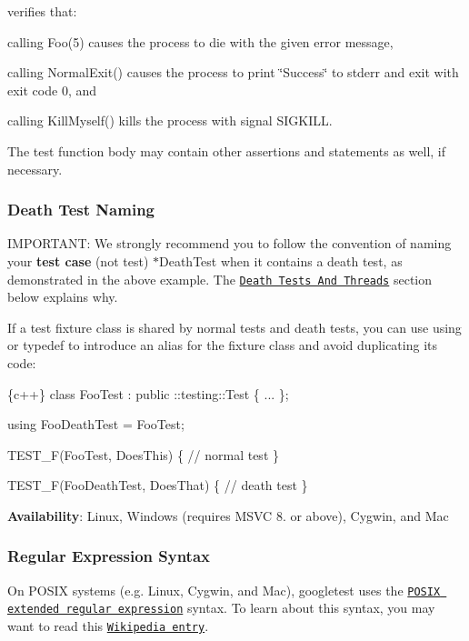 verifies that\+:


\begin{DoxyItemize}
\item calling {\ttfamily Foo(5)} causes the process to die with the given error message,
\item calling {\ttfamily Normal\+Exit()} causes the process to print {\ttfamily \char`\"{}\+Success\char`\"{}} to stderr and exit with exit code 0, and
\item calling {\ttfamily Kill\+Myself()} kills the process with signal {\ttfamily S\+I\+G\+K\+I\+LL}.
\end{DoxyItemize}

The test function body may contain other assertions and statements as well, if necessary.

\subsubsection*{Death Test Naming}

I\+M\+P\+O\+R\+T\+A\+NT\+: We strongly recommend you to follow the convention of naming your {\bfseries test case} (not test) {\ttfamily $\ast$\+Death\+Test} when it contains a death test, as demonstrated in the above example. The \href{#death-tests-and-threads}{\tt Death Tests And Threads} section below explains why.

If a test fixture class is shared by normal tests and death tests, you can use {\ttfamily using} or {\ttfamily typedef} to introduce an alias for the fixture class and avoid duplicating its code\+:


\begin{DoxyCode}
\{c++\}
class FooTest : public ::testing::Test \{ ... \};

using FooDeathTest = FooTest;

TEST\_F(FooTest, DoesThis) \{
  // normal test
\}

TEST\_F(FooDeathTest, DoesThat) \{
  // death test
\}
\end{DoxyCode}


{\bfseries Availability}\+: Linux, Windows (requires M\+S\+VC 8. or above), Cygwin, and Mac

\subsubsection*{Regular Expression Syntax}

On P\+O\+S\+IX systems (e.\+g. Linux, Cygwin, and Mac), googletest uses the \href{http://www.opengroup.org/onlinepubs/009695399/basedefs/xbd_chap09.html#tag_09_04}{\tt P\+O\+S\+IX extended regular expression} syntax. To learn about this syntax, you may want to read this \href{http://en.wikipedia.org/wiki/Regular_expression#POSIX_Extended_Regular_Expressions}{\tt Wikipedia entry}.

